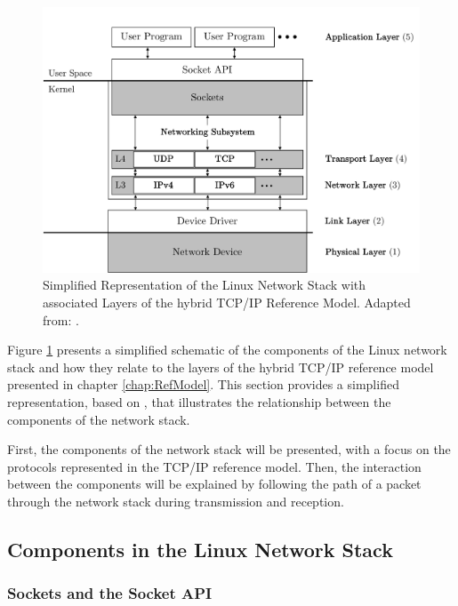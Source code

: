 \begin{figure}[h]
    \centering
    \includegraphics[width=1\linewidth]{figures/linux_nwstack/image03.pdf}
    \caption[Simplified Representation of the Linux Network Stack with associated Layers of the hybrid TCP/IP Reference Model]{Simplified Representation of the Linux Network Stack with associated Layers of the hybrid TCP/IP Reference Model. Adapted from: \cite{lins06}.}
    \label{fig:NWStack}
\end{figure}

Figure \ref{fig:NWStack} presents a simplified schematic of the components of the Linux network stack and how they relate to the layers of the hybrid TCP/IP reference model presented in chapter \ref{chap:RefModel}. This section provides a simplified representation, based on \cite{lins06}, that illustrates the relationship between the components of the network stack. 

First, the components of the network stack will be presented, with a focus on the protocols represented in the TCP/IP reference model. Then, the interaction between the components will be explained by following the path of a packet through the network stack during transmission and reception.


\subsection{Components in the Linux Network Stack}

\subsubsection{Sockets and the Socket API}


